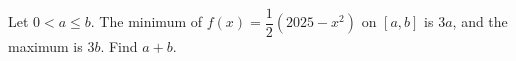 Let $0<a\le b$. The minimum of $f(x)=\dfrac{1}{2}(2025-x^2)$ on $[a,b]$ is $3a$, and the maximum is $3b$. Find $a+b$.
